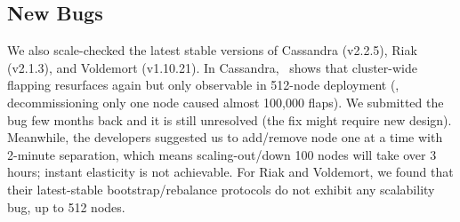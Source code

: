 


\subsection{New Bugs}
\label{eval-new}



We also scale-checked the latest stable versions of Cassandra (v2.2.5),
Riak (v2.1.3), and Voldemort (v1.10.21). 
%
In Cassandra, \sck\ shows that cluster-wide flapping resurfaces again but
only observable in 512-node deployment (\eg, decommissioning only one node
caused almost 100,000 flaps).  We submitted the bug few months back and it
is still unresolved (the fix might require new design).
%
Meanwhile, the developers suggested us to add/remove node one at a time
with 2-minute separation, which means scaling-out/down 100 nodes will take
over 3 hours; instant elasticity is not achievable.
%
%
%
For Riak and Voldemort, we found that their latest-stable
bootstrap/rebalance protocols do not exhibit any scalability bug, up to
512 nodes.


\fi


